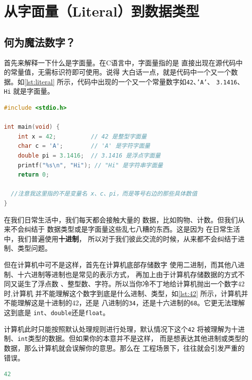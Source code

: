 \section{从字面量（Literal）到数据类型}

\subsection{何为魔法数字？}%
首先来解释一下什么是字面量。在C语言中，字面量指的是
直接出现在源代码中的常量值，无需标识符即可使用。说得
大白话一点，就是代码中一个又一个数据。如\autoref{lst:literal}
所示，代码中出现的一个又一个常量数字如\texttt{42}、\texttt{'A'}、
\texttt{3.1416}、\texttt{Hi}
就是字面量。


\begin{lstlisting}[language=C,caption={C 语言中字面量的示例},label={lst:literal}]
#include <stdio.h>

int main(void) {
    int x = 42;          // 42 是整型字面量
    char c = 'A';        // 'A' 是字符字面量
    double pi = 3.1416;  // 3.1416 是浮点字面量
    printf("%s\n", "Hi"); // "Hi" 是字符串字面量
    return 0;

  //注意我这里指的不是变量名 x、c、pi，而是等号右边的那些具体数值  
}
\end{lstlisting}


在我们日常生活中，我们每天都会接触大量的
数据，比如购物、计数。但我们从来不会纠结于
数据类型或是字面量这些乱七八糟的东西。这是因为
在日常生活中，我们普遍使用\textbf{十进制}，
所以对于我们彼此交流的时候，从来都不会纠结于进制、类型问题。


但在计算机中可不是这样，首先在计算机底部存储数字
使用二进制，而其他八进制、十六进制等进制也是常见的表示方式，
再加上由于计算机存储数据的方式不同又诞生了浮点数
、整型数、字符。所以当你冷不丁地给计算机抛出一个数字42时,计算机
并不能理解这个数字到底是什么进制、类型，如\autoref{lst:42}
所示，计算机并不能理解这是十进制的42，还是
八进制的\texttt{34}，还是十六进制的\texttt{68}。它更无法理解这到底是
\texttt{int}、\texttt{double}还是\texttt{float}。

计算机此时只能按照默认处理规则进行处理，默认情况下这个\texttt{42}
将被理解为十进制、\texttt{int}类型的数据。但如果你的本意并不是这样，
而是想表达其他进制或类型的数据，那么计算机就会误解你的意思。那么在
工程场景下，往往就会引发严重的错误。


\begin{lstlisting}[language=C,caption={魔法数字实例},label={lst:42}]
                                      42
\end{lstlisting}

